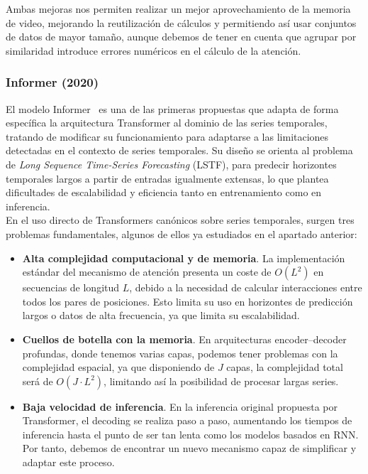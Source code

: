 Ambas mejoras nos permiten realizar un mejor aprovechamiento de la memoria de video, mejorando la reutilización de cálculos y permitiendo así usar conjuntos de datos de mayor tamaño, aunque debemos de tener en cuenta que agrupar por similaridad introduce errores numéricos en el cálculo de la atención.

\subsubsection{Informer (2020)}

El modelo Informer~\cite{zhou2021informerefficienttransformerlong} es una de las primeras propuestas que adapta de forma específica la arquitectura Transformer al dominio de las series temporales, tratando de modificar su funcionamiento para adaptarse a las limitaciones detectadas en el contexto de series temporales. Su diseño se orienta al problema de \textit{Long Sequence Time-Series Forecasting} (LSTF), para predecir horizontes temporales largos a partir de entradas igualmente extensas, lo que plantea dificultades de escalabilidad y eficiencia tanto en entrenamiento como en inferencia.\\

En el uso directo de Transformers canónicos sobre series temporales, surgen tres problemas fundamentales, algunos de ellos ya estudiados en el apartado anterior:

\begin{itemize}
	\item \textbf{Alta complejidad computacional y de memoria}. La implementación estándar del mecanismo de atención presenta un coste de $O(L^2)$ en secuencias de longitud $L$, debido a la necesidad de calcular interacciones entre todos los pares de posiciones. Esto limita su uso en horizontes de predicción largos o datos de alta frecuencia, ya que limita su escalabilidad.
	\item \textbf{Cuellos de botella con la memoria}. En arquitecturas encoder–decoder profundas, donde tenemos varias capas, podemos tener problemas con la complejidad espacial, ya que disponiendo de $J$ capas, la complejidad total será de $O(J \cdot L^2)$, limitando así la posibilidad de procesar largas series.
	\item \textbf{Baja velocidad de inferencia}. En la inferencia original propuesta por Transformer, el decoding se realiza paso a paso, aumentando los tiempos de inferencia hasta el punto de ser tan lenta como los modelos basados en RNN. Por tanto, debemos de encontrar un nuevo mecanismo capaz de simplificar y adaptar este proceso.
\end{itemize}

